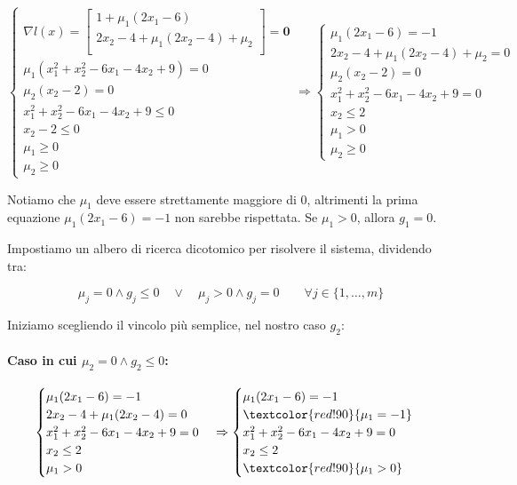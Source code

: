 \documentclass[\main/main.tex]{subfiles}
\begin{document}
\[
	\begin{cases}
		\nabla l(x) = \begin{bmatrix}
			1 + \mu_1(2x_1 - 6)                   \\
			2x_2 -4 + \mu_1(2x_2 - 4) + \mu_2 \\
		\end{bmatrix}
		= \bm{0}                            \\
		\mu_1 (x^2_1+x^2_2-6x_1-4x_2+9) = 0 \\
		\mu_2 (x_2-2) = 0                   \\
		x^2_1+x^2_2-6x_1-4x_2+9 \leq 0      \\
		x_2-2 \leq 0                        \\
		\mu_1 \geq 0                        \\
		\mu_2 \geq 0
	\end{cases}
	\Rightarrow
	\begin{cases}
		\mu_1(2x_1 - 6) = -1                      \\
		2x_2 -4 + \mu_1(2x_2 - 4) + \mu_2 = 0 \\
		\mu_2 (x_2-2) = 0                         \\
		x^2_1+x^2_2-6x_1-4x_2+9 = 0               \\
		x_2 \leq 2                                \\
		\mu_1 > 0                                 \\
		\mu_2 \geq 0
	\end{cases}
\]

Notiamo che $\mu_1$ deve essere strettamente maggiore di 0, altrimenti la prima equazione $\mu_1(2x_1 - 6) = -1$ non sarebbe rispettata. Se $\mu_1 > 0$, allora $g_1 = 0$.

Impostiamo un albero di ricerca dicotomico per risolvere il sistema, dividendo tra:

\[
	\mu_j = 0 \land g_j \leq 0 \quad \lor \quad \mu_j > 0 \land g_j = 0 \qquad \forall j \in \{1, \ldots, m\}
\]

Iniziamo scegliendo il vincolo più semplice, nel nostro caso $g_2$:

\paragraph*{Caso in cui $\mu_2 = 0 \land g_2 \leq 0$:}
\[
	\begin{cases}
		\mu_1(2x_1 - 6) = -1          \\
		2x_2 -4 + \mu_1(2x_2 - 4) = 0 \\
		x^2_1+x^2_2-6x_1-4x_2+9 = 0   \\
		x_2 \leq 2                    \\
		\mu_1 > 0
	\end{cases}
	\Rightarrow
	\begin{cases}
		\mu_1(2x_1 - 6) = -1           \\
		\textcolor{red!90}{\mu_1 = -1} \\
		x^2_1+x^2_2-6x_1-4x_2+9 = 0    \\
		x_2 \leq 2                     \\
		\textcolor{red!90}{\mu_1 > 0}
	\end{cases}
\]
\end{document}
